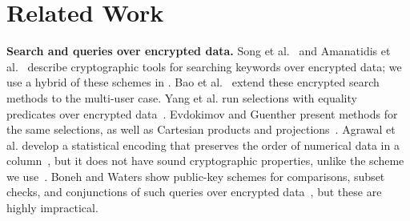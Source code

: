 
\section{Related Work}
\label{s:related}

{\bf Search and queries over encrypted data.}
Song et al.~\cite{Dawn-Song-Search-2000} and Amanatidis et
al.~\cite{amanatidis-boldyreva-o'neill} describe cryptographic tools
for searching keywords over encrypted data; we use a hybrid of these
schemes in \name{}.
Bao et al.~\cite{private-query-multi-user-for-searchable} extend these
encrypted search methods to the multi-user case.
Yang et al. run selections with equality predicates over encrypted
data~\cite{Yang-privacy-preserving-queries}.  Evdokimov and Guenther
present methods for the same selections, as well as Cartesian products
and projections~\cite{encrypt-for-secure-outsource}.  Agrawal et
al. develop a statistical encoding that preserves the order of
numerical data in a column~\cite{agrawal2004order}, but it does not
have sound cryptographic properties, unlike the scheme we
use~\cite{boldyreva-ope}. Boneh and Waters show public-key schemes for
comparisons, subset checks, and conjunctions of such queries over
encrypted data~\cite{queriesEncryptionBoneh}, but these are highly
impractical. 



